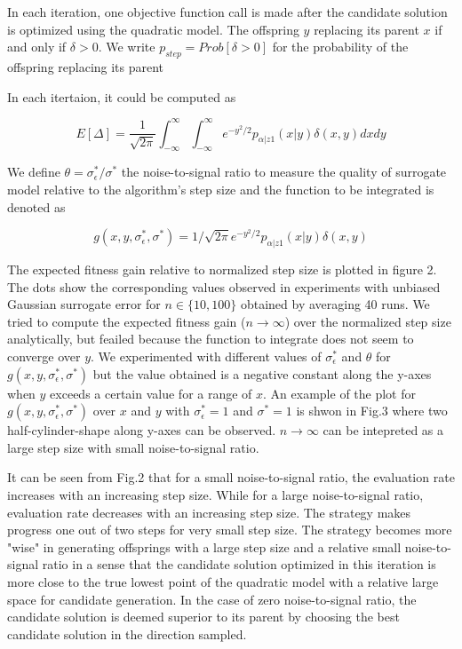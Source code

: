 In each iteration, one objective function call is made after the candidate solution is optimized using the quadratic model. The offspring $y$ replacing its parent $x$ if and only if $\delta >0$. We write $p_{step} = Prob[\delta > 0]$ for the probability of the offspring replacing its parent


In each itertaion, it could be computed as

$$  E[\Delta] = \frac{1}{\sqrt{2 \pi}} \int_{-\infty}^\infty\int_{-\infty}^\infty e^{-y^2/2} p_{\alpha|z1}(x|y) \delta(x, y) dx dy$$


We define $\theta = \sigma_\epsilon^* / \sigma^*$ the noise-to-signal ratio to measure the quality of surrogate model relative to the algorithm's step size and the function to be integrated is denoted as

$$g(x,y,\sigma_\epsilon^*, \sigma^*)= 1/ \sqrt{2 \pi} e^{-y^2/2} p_{\alpha|z1}(x|y) \delta(x, y)$$

The expected fitness gain relative to normalized step size is plotted in figure 2. The dots show the corresponding values observed in experiments with unbiased Gaussian surrogate error for $n \in \{10, 100\}$ obtained by averaging 40 runs. We tried to compute the expected fitness gain ($n \rightarrow \infty$) over the normalized step size analytically, but feailed because the function to integrate does not seem to converge over $y$. We experimented with different values of $\sigma_\epsilon^*$ and $\theta$ for $g(x,y,\sigma_\epsilon^*, \sigma^*)$ but the value obtained is a negative constant along the y-axes when $y$ exceeds a certain value for a range of $x$. An example of the plot for $g(x,y,\sigma_\epsilon^*, \sigma^*)$ over $x$ and $y$ with $\sigma_\epsilon^*=1$ and $\sigma^*=1$ is shwon in Fig.3 where two half-cylinder-shape along y-axes can be observed. $n \rightarrow \infty$ can be intepreted as a large step size with small noise-to-signal ratio.  



It can be seen from Fig.2 that for a small noise-to-signal ratio, the evaluation rate increases with an increasing step size. While for a large noise-to-signal ratio, evaluation rate decreases with an increasing step size. The strategy makes progress one out of two steps for very small step size. The strategy becomes more "wise" in generating offsprings with a large step size and a relative small noise-to-signal ratio in a sense that the candidate solution optimized in this iteration is more close to the true lowest point of the quadratic model with a relative large space for candidate generation. In the case of zero noise-to-signal ratio, the candidate solution is deemed superior to its parent by choosing the best candidate solution in the direction sampled. 

